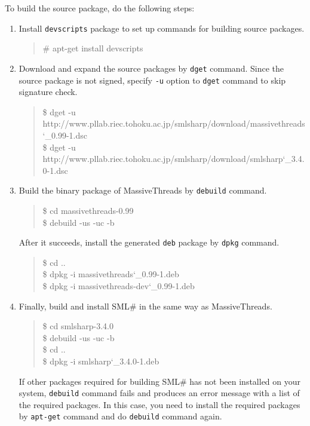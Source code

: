 \documentclass{jbook}
\newcommand{\smlsharp}{SML\#}
\newcommand{\version}{3.4.0}
\newenvironment{program}{\begin{quote}\begin{tt}}%
                        {\end{tt}\end{quote}}
\begin{document}
	To build the source package, do the following steps:
\begin{enumerate}
\item
	Install {\tt devscripts} package to set up commands for building
source packages.
\begin{program}
\# apt-get install devscripts
\end{program}
\item
	Download and expand the source packages by {\tt dget} command.
	Since the source package is not signed,
specify {\tt -u} option to {\tt dget} command to skip signature
check.
\begin{program}
\$ dget -u http://www.pllab.riec.tohoku.ac.jp/smlsharp/download/massivethreads\char`\_0.99-1.dsc\\
\$ dget -u http://www.pllab.riec.tohoku.ac.jp/smlsharp/download/smlsharp\char`\_\version-1.dsc
\end{program}
\item
	Build the binary package of MassiveThreads by {\tt debuild} command.
\begin{program}
\$ cd massivethreads-0.99\\
\$ debuild -us -uc -b
\end{program}
	After it succeeds, install the generated {\tt deb} package by
{\tt dpkg} command.
\begin{program}
\$ cd ..\\
\$ dpkg -i massivethreads\char`\_0.99-1.deb\\
\$ dpkg -i massivethreads-dev\char`\_0.99-1.deb
\end{program}

\item
	Finally, build and install \smlsharp{}
in the same way as MassiveThreads.
\begin{program}
\$ cd smlsharp-\version\\
\$ debuild -us -uc -b\\
\$ cd ..\\
\$ dpkg -i smlsharp\char`\_\version-1.deb
\end{program}
	If other packages required for building \smlsharp{} has not been
installed on your system, {\tt debuild} command fails and produces an error
message with a list of the required packages.
	In this case, you need to install the required packages by
{\tt apt-get} command and do {\tt debuild} command again.

\begin{program}
\end{program}
\end{enumerate}
\end{document}
